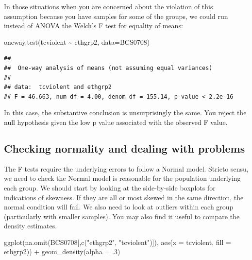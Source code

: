 \documentclass[
]{book}
\newenvironment{Shaded}{\begin{snugshade}}{\end{snugshade}}
\newcommand{\AttributeTok}[1]{\textcolor[rgb]{0.77,0.63,0.00}{#1}}
\newcommand{\DecValTok}[1]{\textcolor[rgb]{0.00,0.00,0.81}{#1}}
\newcommand{\FunctionTok}[1]{\textcolor[rgb]{0.00,0.00,0.00}{#1}}
\newcommand{\NormalTok}[1]{#1}
\newcommand{\SpecialCharTok}[1]{\textcolor[rgb]{0.00,0.00,0.00}{#1}}
\newcommand{\StringTok}[1]{\textcolor[rgb]{0.31,0.60,0.02}{#1}}
\begin{document}
In those situations when you are concerned about the violation of this assumption because you have samples for some of the groups, we could run instead of ANOVA the Welch's F test for equality of means:

\begin{Shaded}
\begin{Highlighting}[]
\FunctionTok{oneway.test}\NormalTok{(tcviolent }\SpecialCharTok{\textasciitilde{}}\NormalTok{ ethgrp2, }\AttributeTok{data=}\NormalTok{BCS0708)}
\end{Highlighting}
\end{Shaded}

\begin{verbatim}
## 
##  One-way analysis of means (not assuming equal variances)
## 
## data:  tcviolent and ethgrp2
## F = 46.663, num df = 4.00, denom df = 155.14, p-value < 2.2e-16
\end{verbatim}

In this case, the substantive conclusion is unsurprisingly the same. You reject the null hypothesis given the low p value associated with the observed F value.

\hypertarget{checking-normality-and-dealing-with-problems}{%
\subsection{Checking normality and dealing with problems}\label{checking-normality-and-dealing-with-problems}}

The F tests require the underlying errors to follow a Normal model. Stricto sensu, we need to check the Normal model is reasonable for the population underlying each group. We should start by looking at the side-by-side boxplots for indications of skewness. If they are all or most skewed in the same direction, the normal condition will fail. We also need to look at outliers within each group (particularly with smaller samples). You may also find it useful to compare the density estimates.

\begin{Shaded}
\begin{Highlighting}[]
\FunctionTok{ggplot}\NormalTok{(}\FunctionTok{na.omit}\NormalTok{(BCS0708[,}\FunctionTok{c}\NormalTok{(}\StringTok{"ethgrp2"}\NormalTok{, }\StringTok{"tcviolent"}\NormalTok{)]), }\FunctionTok{aes}\NormalTok{(}\AttributeTok{x =}\NormalTok{ tcviolent, }\AttributeTok{fill =}\NormalTok{ ethgrp2)) }\SpecialCharTok{+} 
  \FunctionTok{geom\_density}\NormalTok{(}\AttributeTok{alpha =}\NormalTok{ .}\DecValTok{3}\NormalTok{)}
\end{Highlighting}
\end{Shaded}
\end{document}
